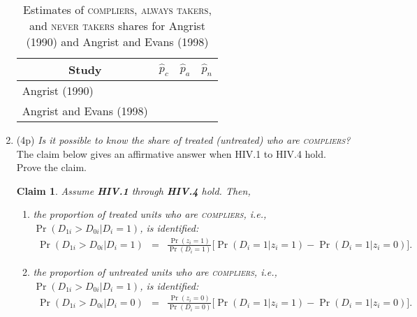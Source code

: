 \documentclass{article}
\newtheorem{claim}[theorem]{Claim}
\begin{document}
\begin{enumerate}[label=\textbf{Q\arabic{enumi}}.,ref=Q\arabic{enumi}, wide=0pt, itemsep=0em, topsep=5pt, labelindent=0pt, resume]
\begin{table}[H]
\centering
{\renewcommand{\arraystretch}{1.5}
\begin{tabular}{cccc}
\hline\hline
\textbf{Study} &  $\hat{p}_c$ & $\hat{p}_a$ & $\hat{p}_n$ \\ \hline
\multicolumn{1}{l}{Angrist (1990)}  &  &  \\ 
\multicolumn{1}{l}{Angrist and Evans (1998)}  &  &  \\ 
\hline\hline
\end{tabular} 
} 
\caption{Estimates of \textsc{compliers}, \textsc{always takers}, and \textsc{never takers} shares for Angrist (1990) and Angrist and Evans (1998)}
\label{tab:ds-angrist-share-estimates}
\end{table}

\item (4p) \textit{Is it possible to know the share of treated (untreated) who are \textsc{compliers}?} The claim below gives an affirmative answer when HIV.1 to HIV.4 hold. Prove the claim.

\begin{claim}\label{cl:identification_compliers_conditional_shares}
Assume \textbf{HIV.1} through \textbf{HIV.4} hold. Then,
\begin{enumerate}
\item the proportion of treated units who are \textsc{compliers}, i.e., $\Pr \left( D_{1i}>D_{0i}|D_{i}=1\right)$, is identified:
\begin{eqnarray*}
\Pr \left( D_{1i}>D_{0i}|D_{i}=1\right)  &=&\frac{\Pr \left( z_{i}=1\right) 
}{\Pr \left( D_{i}=1\right) }\Big[\Pr(D_i=1|z_i=1)-\Pr(D_i=1|z_i=0) \Big].
\end{eqnarray*}

\item the proportion of untreated units who are \textsc{compliers}, i.e., $\Pr \left( D_{1i}>D_{0i}|D_{i}=1\right)$, is identified:
\begin{eqnarray*}
\Pr \left( D_{1i}>D_{0i}|D_{i}=0\right)  &=&\frac{\Pr \left( z_{i}=0\right) 
}{\Pr \left( D_{i}=0\right) }\Big[\Pr(D_i=1|z_i=1)-\Pr(D_i=1|z_i=0) \Big].
\end{eqnarray*}
\end{enumerate}
\end{claim}



\end{enumerate}
\end{document}
